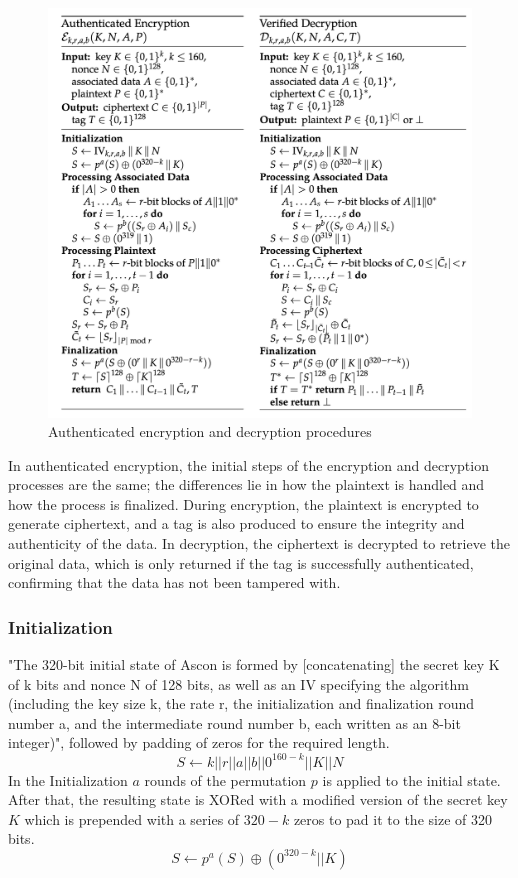 \begin{figure}[H]
    \centering
    \includegraphics[width=1\textwidth]{figures/alg.png}
    \caption{Authenticated encryption and decryption procedures \cite{Ascon-v1.2}}
    \label{fig:procedure}
\end{figure}

In authenticated encryption, the initial steps of the encryption and decryption processes are the same; the differences lie in how the plaintext is handled and how the process is finalized. During encryption, the plaintext is encrypted to generate ciphertext, and a tag is also produced to ensure the integrity and authenticity of the data. In decryption, the ciphertext is decrypted to retrieve the original data, which is only returned if the tag is successfully authenticated, confirming that the data has not been tampered with.

\subsubsection{Initialization}
"The 320-bit initial state of Ascon is formed by [concatenating] the secret key K of k bits and nonce N of 128 bits, as well as an IV specifying the algorithm (including the key size k, the rate r, the initialization and finalization round number a, and the intermediate round number b, each written as an 8-bit integer)", followed by padding of zeros for the required length.
$$S \leftarrow k || r || a || b || 0^{160-k} || K || N $$
In the Initialization $a$ rounds of the permutation $p$ is applied to the initial state. After that, the resulting state is XORed with a modified version of the secret key $K$ which is prepended with a series of $320-k$ zeros to pad it to the size of 320 bits. \cite{Ascon-v1.2}
$$S \leftarrow p^a(S) \oplus (0^{320-k} || K)$$

